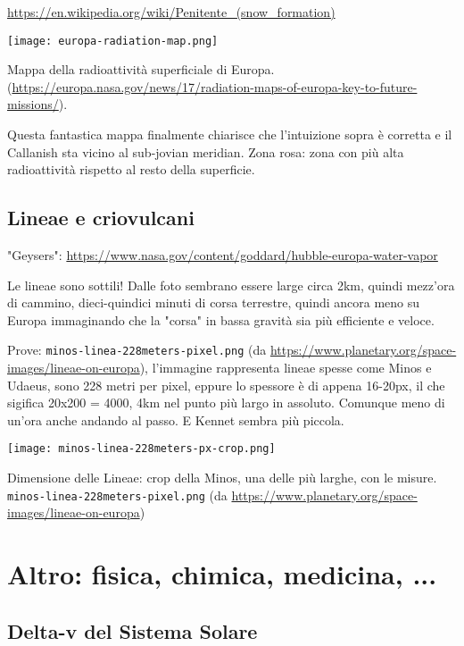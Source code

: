 \documentclass[a4paper,10pt,openany,oneside]{memoir}
\begin{document}
\url{https://en.wikipedia.org/wiki/Penitente_(snow_formation)}

\hfill 

\texttt{[image: europa-radiation-map.png]}

Mappa della radioattività superficiale di Europa. (\url{https://europa.nasa.gov/news/17/radiation-maps-of-europa-key-to-future-missions/}).

Questa fantastica mappa finalmente chiarisce che l'intuizione sopra è corretta e il Callanish sta vicino al sub-jovian meridian. Zona rosa: zona con più alta radioattività rispetto al resto della superficie.



\section{Lineae e criovulcani}

"Geysers": \url{https://www.nasa.gov/content/goddard/hubble-europa-water-vapor}

Le lineae sono sottili! Dalle foto sembrano essere large circa 2km, quindi mezz'ora di cammino, dieci-quindici minuti di corsa terrestre, quindi ancora meno su Europa immaginando che la "corsa" in bassa gravità sia più efficiente e veloce. 

Prove: \texttt{minos-linea-228meters-pixel.png} (da \url{https://www.planetary.org/space-images/lineae-on-europa}), l'immagine rappresenta lineae spesse come Minos e Udaeus, sono 228 metri per pixel, eppure lo spessore è di appena 16-20px, il che sigifica 20x200 = 4000, 4km nel punto più largo in assoluto. Comunque meno di un'ora anche andando al passo. E Kennet sembra più piccola.


\texttt{[image: minos-linea-228meters-px-crop.png]}

Dimensione delle Lineae: crop della Minos, una delle più larghe, con le misure. \texttt{minos-linea-228meters-pixel.png} (da \url{https://www.planetary.org/space-images/lineae-on-europa})
  
  




\chapter{Altro: fisica, chimica, medicina, ...}


\section{Delta-v del Sistema Solare}
\end{document}
